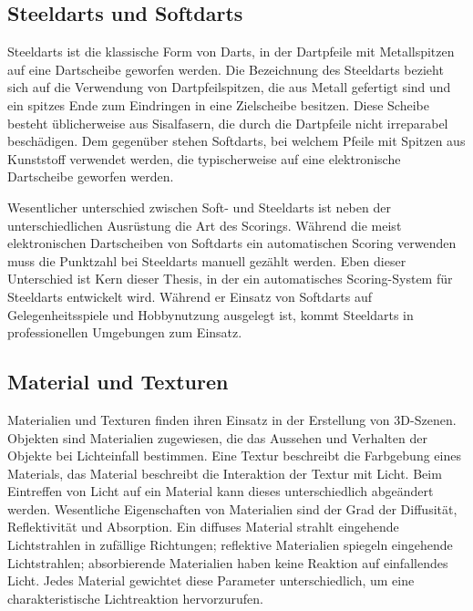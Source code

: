 
\subsection{Steeldarts und Softdarts}
\label{sec:steeldarts}

Steeldarts ist die klassische Form von Darts, in der Dartpfeile mit Metallspitzen auf eine Dartscheibe geworfen werden. Die Bezeichnung des Steeldarts bezieht sich auf die Verwendung von Dartpfeilspitzen, die aus Metall gefertigt sind und ein spitzes Ende zum Eindringen in eine Zielscheibe besitzen. Diese Scheibe besteht üblicherweise aus Sisalfasern, die durch die Dartpfeile nicht irreparabel beschädigen. Dem gegenüber stehen Softdarts, bei welchem Pfeile mit Spitzen aus Kunststoff verwendet werden, die typischerweise auf eine elektronische Dartscheibe geworfen werden.

Wesentlicher unterschied zwischen Soft- und Steeldarts ist neben der unterschiedlichen Ausrüstung die Art des Scorings. Während die meist elektronischen Dartscheiben von Softdarts ein automatischen Scoring verwenden muss die Punktzahl bei Steeldarts manuell gezählt werden. Eben dieser Unterschied ist Kern dieser Thesis, in der ein automatisches Scoring-System für Steeldarts entwickelt wird. Während er Einsatz von Softdarts auf Gelegenheitsspiele und Hobbynutzung ausgelegt ist, kommt Steeldarts in professionellen Umgebungen zum Einsatz.


\subsection{Material und Texturen}  %
\label{sec:material_texturen}

Materialien und Texturen finden ihren Einsatz in der Erstellung von 3D-Szenen. Objekten sind Materialien zugewiesen, die das Aussehen und Verhalten der Objekte bei Lichteinfall bestimmen. Eine Textur beschreibt die Farbgebung eines Materials, das Material beschreibt die Interaktion der Textur mit Licht. Beim Eintreffen von Licht auf ein Material kann dieses unterschiedlich abgeändert werden. Wesentliche Eigenschaften von Materialien sind der Grad der Diffusität, Reflektivität und Absorption. Ein diffuses Material strahlt eingehende Lichtstrahlen in zufällige Richtungen; reflektive Materialien spiegeln eingehende Lichtstrahlen; absorbierende Materialien haben keine Reaktion auf einfallendes Licht. Jedes Material gewichtet diese Parameter unterschiedlich, um eine charakteristische Lichtreaktion hervorzurufen.


